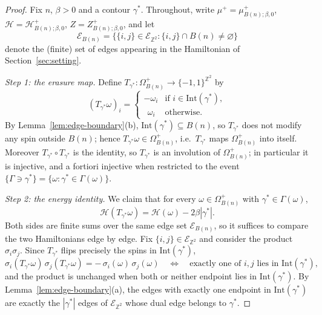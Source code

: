 \documentclass[11pt]{article}
\theoremstyle{plain}
\theoremstyle{definition}
\theoremstyle{remark}
\newcommand{\Z}{\mathbb{Z}}
\newcommand{\sg}{\sigma}
\newcommand{\Ham}{\mathcal{H}}
\newcommand{\Eset}{\mathscr{E}}
\newcommand{\Intr}{\mathrm{Int}}    %
\newcommand{\Gam}{\Gamma}           %
\begin{document}
\begin{proof}
Fix $n$, $\beta>0$ and a contour $\gamma^*$. Throughout, write
$\mu^{+}=\mu^{+}_{B(n);\beta,0}$, $\Ham=\Ham^{+}_{B(n);\beta,0}$,
$Z=Z^{+}_{B(n);\beta,0}$, and let
\[
  \Eset_{B(n)}
  =\bigl\{\{i,j\}\in\Eset_{\Z^2} : \{i,j\}\cap B(n)\neq\varnothing\bigr\}
\]
denote the (finite) set of edges appearing in the Hamiltonian of
Section~\ref{sec:setting}.

\medskip\noindent\emph{Step 1: the erasure map.}
Define $T_{\gamma^*}:\Omega^{+}_{B(n)}\to\{-1,1\}^{\Z^2}$ by
\[
  (T_{\gamma^*}\omega)_i=
  \begin{cases}
    -\omega_i & \text{if } i\in\Intr(\gamma^*),\\
    \ \ \omega_i & \text{otherwise.}
  \end{cases}
\]
By Lemma~\ref{lem:edge-boundary}(b), $\Intr(\gamma^*)\subseteq B(n)$, so
$T_{\gamma^*}$ does not modify any spin outside $B(n)$; hence
$T_{\gamma^*}\omega\in\Omega^{+}_{B(n)}$, i.e.\ $T_{\gamma^*}$ maps
$\Omega^{+}_{B(n)}$ into itself. Moreover $T_{\gamma^*}\circ T_{\gamma^*}$ is
the identity, so $T_{\gamma^*}$ is an involution of $\Omega^{+}_{B(n)}$; in
particular it is injective, and a fortiori injective when restricted to the
event $\{\Gam\ni\gamma^*\}=\{\omega:\gamma^*\in\Gam(\omega)\}$.

\medskip\noindent\emph{Step 2: the energy identity.}
We claim that for every $\omega\in\Omega^{+}_{B(n)}$ with
$\gamma^*\in\Gam(\omega)$,
\begin{equation}
  \label{eq:energy-drop}
  \Ham(T_{\gamma^*}\omega)=\Ham(\omega)-2\beta|\gamma^*| .
\end{equation}
Both sides are finite sums over the same edge set $\Eset_{B(n)}$, so it
suffices to compare the two Hamiltonians edge by edge. Fix
$\{i,j\}\in\Eset_{\Z^2}$ and consider the product
$\sg_i\sg_j$. Since $T_{\gamma^*}$ flips precisely the spins in
$\Intr(\gamma^*)$,
\[
  \sg_i(T_{\gamma^*}\omega)\,\sg_j(T_{\gamma^*}\omega)
  =-\,\sg_i(\omega)\,\sg_j(\omega)
  \quad\Longleftrightarrow\quad
  \text{exactly one of } i,j \text{ lies in } \Intr(\gamma^*),
\]
and the product is unchanged when both or neither endpoint lies in
$\Intr(\gamma^*)$. By Lemma~\ref{lem:edge-boundary}(a), the edges with
exactly one endpoint in $\Intr(\gamma^*)$ are exactly the $|\gamma^*|$ edges
of $\Eset_{\Z^2}$ whose dual edge belongs to $\gamma^*$.


\end{proof}
\end{document}
